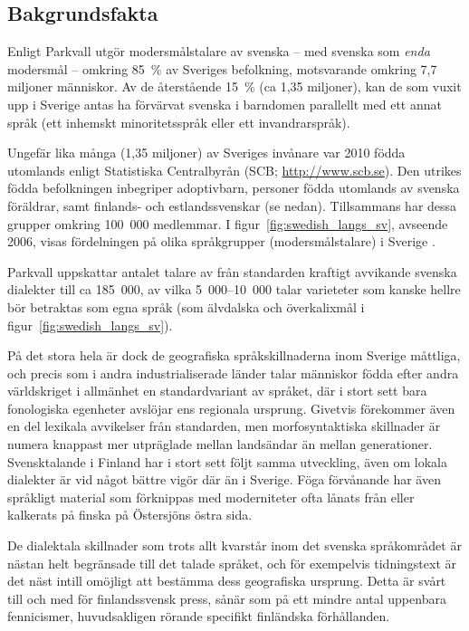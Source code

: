 \begin{multicols}{2}

\subsection{Bakgrundsfakta}
Enligt Parkvall \cite{parkvall2009} utgör modersmålstalare av
svenska -- med svenska som \textit{enda} modersmål -- omkring
85~\% av Sveriges befolkning, motsvarande omkring 7,7 miljoner
människor. Av de återstående 15~\% (ca 1,35 miljoner), kan de som
vuxit upp i Sverige antas ha förvärvat svenska i barndomen parallellt
med ett annat språk (ett inhemskt minoritetsspråk eller ett
invandrarspråk).



Ungefär lika många (1,35 miljoner) av Sveriges invånare var 2010 födda
utomlands enligt Statistiska Centralbyrån
(SCB; \url{http://www.scb.se}). Den utrikes födda befolkningen
inbegriper adoptivbarn, personer födda utomlands av svenska föräldrar,
samt finlands- och estlands­svenskar (se nedan). Tillsammans har dessa
grupper omkring 100~000 medlemmar.  I
figur~\ref{fig:swedish_langs_sv}, avseende 2006, visas fördelningen
på olika språkgrupper (modersmålstalare) i Sverige
\cite{parkvall2009}.

Parkvall \cite{parkvall2009} uppskattar antalet talare av från
standarden kraftigt avvikande svenska dialekter till ca 185~000, av
vilka 5~000--10~000 talar varieteter som kanske hellre bör betraktas
som egna språk (som älvdalska och överkalixmål i
figur~\ref{fig:swedish_langs_sv}).

På det stora hela är dock de geografiska språkskillnaderna inom
Sverige måttliga, och precis som i andra industrialiserade länder
talar människor födda efter andra världskriget i allmänhet en
standardvariant av språket, där i stort sett bara fonologiska
egenheter avslöjar ens regionala ursprung. Givetvis förekommer även en
del lexikala avvikelser från standarden, men morfosyntaktiska
skillnader är numera knappast mer utpräglade mellan landsändar än
mellan generationer. Svensktalande i Finland har i stort sett följt
samma utveckling, även om lokala dialekter är vid något bättre vigör
där än i Sverige. Föga förvånande har även språkligt material som
förknippas med moderniteter ofta lånats från eller kalkerats på finska
på Östersjöns östra sida.

De dialektala skillnader som trots allt kvarstår inom det svenska
språkområdet är nästan helt begränsade till det talade språket, och
för exempelvis tidningstext är det näst intill omöjligt att bestämma
dess geografiska ursprung. Detta är svårt till och med för
finlandssvensk press, sånär som på ett mindre antal uppenbara
fennicismer, huvudsakligen rörande specifikt finländska förhållanden.


\end{multicols}
